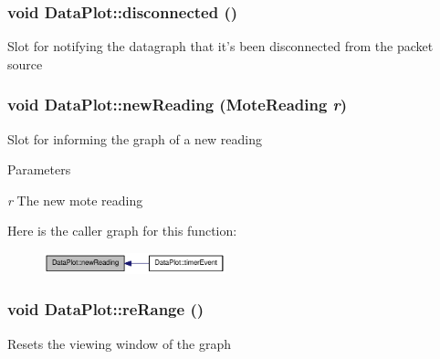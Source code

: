 \hypertarget{classDataPlot_a78920a414abdfa954fd34c662f39d09e}{
\subsubsection[{disconnected}]{\setlength{\rightskip}{0pt plus 5cm}void DataPlot::disconnected ()}}
\label{classDataPlot_a78920a414abdfa954fd34c662f39d09e}
Slot for notifying the datagraph that it's been disconnected from the packet source \hypertarget{classDataPlot_a36fe7e25f67a168d4f7dd2eaa2627003}{
\subsubsection[{newReading}]{\setlength{\rightskip}{0pt plus 5cm}void DataPlot::newReading ({\bf MoteReading} {\em r})}}
\label{classDataPlot_a36fe7e25f67a168d4f7dd2eaa2627003}
Slot for informing the graph of a new reading 
\begin{DoxyParams}{Parameters}
\item[{\em r}]The new mote reading \end{DoxyParams}


Here is the caller graph for this function:\nopagebreak
\begin{figure}[H]
\begin{center}
\leavevmode
\includegraphics[width=149pt]{classDataPlot_a36fe7e25f67a168d4f7dd2eaa2627003_icgraph}
\end{center}
\end{figure}


\hypertarget{classDataPlot_abc77f48da64170d587eda09e5aaf008c}{
\subsubsection[{reRange}]{\setlength{\rightskip}{0pt plus 5cm}void DataPlot::reRange ()}}
\label{classDataPlot_abc77f48da64170d587eda09e5aaf008c}
Resets the viewing window of the graph 

